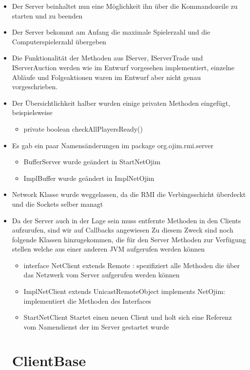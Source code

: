 \documentclass[a4paper,10pt]{article}
\begin{document}
\begin{itemize}
\item Der Server beinhaltet nun eine Möglichkeit ihn über die Kommandozeile zu starten und zu beenden
\item Der Server bekommt am Anfang die maximale Spielerzahl und die Computerspielerzahl übergeben
\item Die Funktionalität der Methoden aus IServer, IServerTrade und IServerAuction werden wie im Entwurf vorgesehen implementiert, einzelne Abläufe und Folgeaktionen waren im Entwurf aber nicht genau vorgeschrieben.
\item Der Übersichtlichkeit halber wurden einige privaten Methoden eingefügt, beispielsweise
\begin{itemize}
\item private boolean checkAllPlayersReady()
\end{itemize}
\item Es gab ein paar Namensänderungen im package org.ojim.rmi.server 
\begin{itemize}
\item BufferServer wurde geändert in StartNetOjim
\item ImplBuffer wurde geändert in ImplNetOjim
\end{itemize}
\item Network Klasse wurde weggelassen, da die RMI die Verbingsschicht überdeckt und die Sockets selber managt
\item Da der Server auch in der Lage sein muss entfernte Methoden in den Clients aufzurufen, sind wir auf Callbacks angewiesen Zu diesem Zweck sind noch folgende Klassen hinzugekommen, die für den Server Methoden zur Verfügung stellen welche aus einer anderen JVM aufgerufen werden können
\begin{itemize}
\item interface NetClient extends Remote : spezifiziert alle Methoden die über das Netzwerk vom Server aufgerufen werden können 
\item ImplNetClient extends UnicastRemoteObject implements NetOjim: implementiert die Methoden des Interfaces
\item StartNetClient Startet einen neuen Client und holt sich eine Referenz vom Namendienst der im Server gestartet wurde
\end{itemize}

\section{ClientBase}

\end{itemize}
\end{document}

